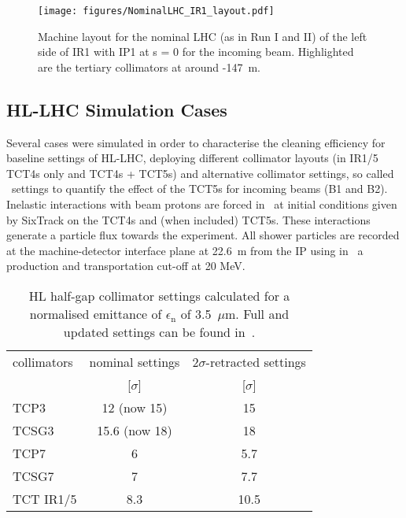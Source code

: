\begin{figure}[!htb]
\begin{center}
\texttt{[image: figures/NominalLHC\_IR1\_layout.pdf]}
\end{center}
\vspace{-0.6cm}
 \caption{Machine layout for the nominal LHC (as in Run I and II) of the left side of IR1 with IP1 at s = 0 for the incoming beam. Highlighted are the tertiary collimators at around -147~m.
  \label{nominalLHC_layout}}
\end{figure}


\subsection{HL-LHC Simulation Cases}
Several cases were simulated in order to characterise the cleaning efficiency for baseline settings of HL-LHC, deploying different collimator layouts (in IR1/5 TCT4s only and TCT4s + TCT5s) and alternative collimator settings, so called \twosigmaret~settings to quantify the effect of the TCT5s for incoming beams (B1 and B2). Inelastic interactions with beam protons are forced in \fluka~at initial conditions given by SixTrack on the TCT4s and (when included) TCT5s. These interactions generate a particle flux towards the experiment. All shower particles are recorded at the machine-detector interface plane at 22.6~m from the IP using in \fluka~a production and transportation cut-off at 20 MeV.

\begin{table}%
   \centering
   \caption{HL half-gap collimator settings calculated for a normalised emittance of $\epsilon_{\mathrm{n}}$ of 3.5~$\mu$m. Full and updated settings can be found in~\cite{collSettRef}.}

   \begin{tabular}{l|c|c}
       \hline
       collimators &        nominal settings & $2\sigma$-retracted settings\\
                   &         [$\sigma$] &  [$\sigma$]\\
       \hline
       TCP3 & 12 (now 15) & 15 \\
       TCSG3 & 15.6 (now 18)& 18 \\
       TCP7 & 6 & 5.7 \\
       TCSG7 & 7 & 7.7 \\
       TCT IR1/5 & 8.3 & 10.5 \\
       \hline
   \end{tabular}
   \label{collSettings}
\end{table}

